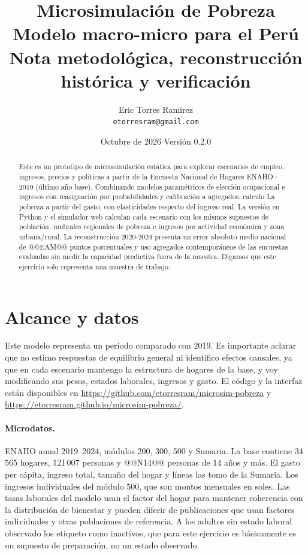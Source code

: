 \documentclass[11pt,a4paper]{article}
\title{\textbf{Microsimulación de Pobreza}\\\large Modelo macro-micro para el Perú\\\normalsize Nota metodológica, reconstrucción histórica y verificación}
\author{Eric Torres Ramírez\\\small\texttt{etorresram@gmail.com}}
\date{Octubre de 2026 \textbullet{} Versión 0.2.0}
\begin{document}
\maketitle
\begin{abstract}
\noindent Este es un prototipo de microsimulación estática para explorar escenarios de empleo, ingresos, precios y políticas a partir de la Encuesta Nacional de Hogares ENAHO - 2019 (último año base). Combinando modelos paramétricos de elección ocupacional e ingresos con reasignación por probabilidades y calibración a agregados, calculo La pobreza a partir del gasto, con elasticidades respecto del ingreso real. La versión en Python y el simulador web calculan cada escenario con los mismos supuestos de población, umbrales regionales de pobreza e ingresos por actividad económica y zona urbana/rural. La reconstrucción 2020-2024 presenta un error absoluto medio nacional de @@EAM@@ puntos porcentuales y uso agregados contemporáneos de las encuestas evaluadas sin medir la capacidad predictiva fuera de la muestra. Digamos que este ejercicio solo representa una muestra de trabajo.
\end{abstract}

\section{Alcance y datos}
Este modelo representa un período comparado con 2019. Es importante aclarar que no estimo respuestas de equilibrio general ni identifico efectos causales, ya que en cada escenario mantengo la estructura de hogares de la base, y voy modificando sus pesos, estados laborales, ingresos y gasto. El código y la interfaz están disponibles en \url{https://github.com/etorresram/microsim-pobreza} y \url{https://etorresram.github.io/microsim-pobreza/}.

\paragraph{Microdatos.} ENAHO anual 2019--2024, módulos 200, 300, 500 y Sumaria. La base contiene 34\,565 hogares, 121\,007 personas y @@N14@@ personas de 14 años y más. El gasto per cápita, ingreso total, tamaño del hogar y líneas las tomo de la Sumaria. Los ingresos individuales del módulo 500, que son montos mensuales en soles. Las tasas laborales del modelo usan el factor del hogar para mantener coherencia con la distribución de bienestar y pueden diferir de publicaciones que usan factores individuales y otras poblaciones de referencia. A los adultos sin estado laboral observado los etiqueto como inactivos, que para este ejercicio es básicamente es un supuesto de preparación, no un estado observado.
\end{document}
